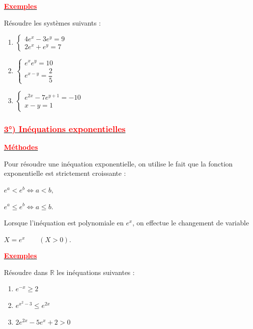 \documentclass[12pt,a4paper]{article}
\begin{document}
\underline{\textbf{\textcolor{red}{Exemples}}}

Résoudre les systèmes suivants :

\begin{enumerate}[label=\alph*)]
\item \(
\begin{cases}
4e^x-3e^y=9\\
2e^x+e^y=7
\end{cases}
\)

\item \(
\begin{cases}
e^xe^y=10\\
e^{x-y}=\dfrac25
\end{cases}
\)

\item \(
\begin{cases}
e^{2x}-7e^{y+1}=-10\\
x-y=1
\end{cases}
\)
\end{enumerate}
\subsubsection*{\underline{\textbf{\textcolor{red}{ 3°) Inéquations exponentielles }}}}

\underline{\textbf{\textcolor{red}{Méthodes}}}

Pour résoudre une inéquation exponentielle, on utilise le fait que la fonction exponentielle est strictement croissante :

\(
e^a<e^b
\Longleftrightarrow
a<b,
\)

\(
e^a\le e^b
\Longleftrightarrow
a\le b.
\)

Lorsque l'inéquation est polynomiale en \(e^x\), on effectue le changement de variable

\(
X=e^x
\qquad(X>0).
\)

\underline{\textbf{\textcolor{red}{Exemples}}}

Résoudre dans \(\mathbb{R}\) les inéquations suivantes :

\begin{enumerate}[label=\alph*)]
    \item \(e^{-x}\ge2\)
    \item \(e^{x^2-3}\le e^{2x}\)
    \item \(2e^{2x}-5e^x+2>0\)
\end{enumerate}
\end{document}
